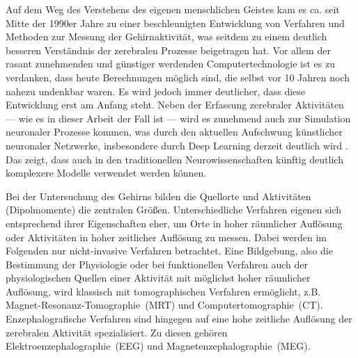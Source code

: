 \documentclass[doc,a4paper,12pt]{apa6}
\begin{document}
Auf dem Weg des Verstehens des eigenen menschlichen Geistes kam es ca. seit Mitte der 1990er Jahre zu einer beschleunigten Entwicklung von Verfahren und Methoden zur Messung der Gehirnaktivität, was seitdem zu einem deutlich besseren Verständnis der zerebralen Prozesse beigetragen hat. Vor allem der rasant zunehmenden und günstiger werdenden Computertechnologie ist es zu verdanken, dass heute Berechnungen möglich sind, die selbst vor 10 Jahren noch nahezu undenkbar waren. Es wird jedoch immer deutlicher, dass diese Entwicklung erst am Anfang steht. Neben der Erfassung zerebraler Aktivitäten --- wie es in dieser Arbeit der Fall ist --- wird es zunehmend auch zur Simulation neuronaler Prozesse kommen, was durch den aktuellen Aufschwung künstlicher neuronaler Netzwerke, insbesondere durch Deep Learning derzeit deutlich wird \parencite[z.B.][]{ciresan2012multi}. Das zeigt, dass auch in den traditionellen Neurowissenschaften künftig deutlich komplexere Modelle verwendet werden können.

Bei der Untersuchung des Gehirns bilden die Quellorte und Aktivitäten (Dipolmomente) die zentralen Größen. Unterschiedliche Verfahren eigenen sich entsprechend ihrer Eigenschaften eher, um Orte in hoher räumlicher Auflösung oder Aktivitäten in hoher zeitlicher Auflösung zu messen. Dabei werden im Folgenden nur nicht-invasive Verfahren betrachtet. Eine Bildgebung, also die Bestimmung der Physiologie oder bei funktionellen Verfahren auch der physiologischen Quellen einer Aktivität mit möglichst hoher räumlicher Auflösung, wird klassisch mit tomographischen Verfahren ermöglicht, z.B. Magnet-Resonanz-Tomographie~(MRT) und Computertomographie~(CT). Enzephalografische Verfahren sind hingegen auf eine hohe zeitliche Auflösung der zerebralen Aktivität spezialisiert. Zu diesen gehören Elektroenzephalographie~(EEG) und Magnetenzephalographie~(MEG).
\end{document}
